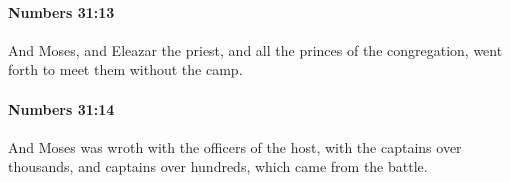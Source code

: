 		\paragraph{Numbers 31:13} %
			\label{NUMBERS-31-13}

			And Moses, and Eleazar the priest, and all the princes of the congregation, went forth to meet them without the camp.


		\paragraph{Numbers 31:14} %
			\label{NUMBERS-31-14}

			And Moses was wroth with the officers of the host, with the captains over thousands, and captains over hundreds, which came from the battle.


